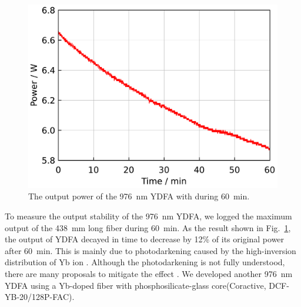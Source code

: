 \documentclass{osa-article}
\begin{document}
\begin{figure}[h!]
  \centering
  \begin{minipage}[b]{0.5\linewidth}
    \centering
    \includegraphics[keepaspectratio, width=0.9\linewidth]{./Figure/Yb1200-20-125DC-PM438mm_LongTermStability_915Pump70W976Seed0.24W_Exp}
  \end{minipage}
  \caption{The output power of the \SI{976}{\nm} YDFA with during \SI{60}{\minute}.}
  \label{fig:LongTermStabilityOfNLIGHT976YDFA}
\end{figure}
To measure the output stability of the \SI{976}{nm} YDFA, we logged the maximum output of the \SI{438}{mm} long fiber during \SI{60}{\minute}.
As the result shown in Fig.~\ref{fig:LongTermStabilityOfNLIGHT976YDFA}, the output of YDFA decayed in time to decrease by 12\% of its original power after \SI{60}{\minute}.
This is mainly due to photodarkening caused by the high-inversion distribution of Yb ion \cite{paschotta1997lifetime}.
Although the photodarkening is not fully understood, there are many proposals to mitigate the effect \cite{manek-honninger2007photodarkening, zhao2019elimination, engholm2008preventing}.
We developed another \SI{976}{\nm} YDFA using a Yb-doped fiber with phosphosilicate-glass core(Coractive, DCF-YB-20/128P-FAC).
\end{document}
